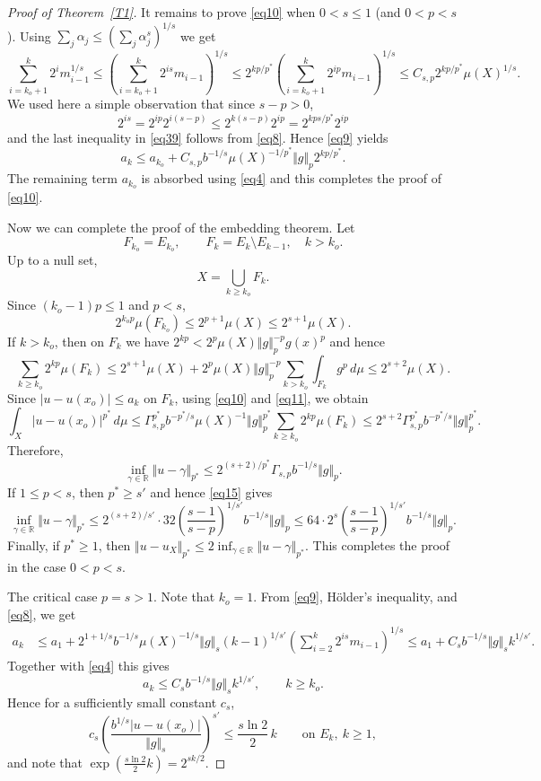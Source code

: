 \documentclass[12pt,leqno]{amsart}
\theoremstyle{definition}
\newcommand{\bbbr}{\mathbb R}
\numberwithin{theorem}{section} \numberwithin{equation}{section}
\begin{document}
\begin{proof}[Proof of Theorem~\ref{T1}]
It remains to prove \eqref{eq10} when $0<s\leq 1$ (and $0<p<s$). Using
$\sum_j\alpha_j\leq\left(\sum_j\alpha_j^s\right)^{1/s}$
we get
\begin{equation}
\label{eq39}
\sum_{i=k_o+1}^k2^im_{i-1}^{1/s}
\leq
\left(\sum_{i=k_o+1}^k2^{is}m_{i-1}\right)^{1/s}
\leq
2^{kp/p^*}
\left(\sum_{i=k_o+1}^k2^{ip}m_{i-1}\right)^{1/s}
\leq C_{s,p}2^{kp/p^*}\mu(X)^{1/s}.
\end{equation}
We used here a simple observation that since $s-p>0$,
\[
2^{is}=2^{ip}2^{i(s-p)}\leq 2^{k(s-p)}2^{ip}=2^{kps/p^*}2^{ip}
\]
and the last inequality in \eqref{eq39} follows from \eqref{eq8}. Hence \eqref{eq9} yields
\[
a_k\leq a_{k_o}+C_{s,p}b^{-1/s}\mu(X)^{-1/p^*}\Vert g\Vert_p2^{kp/p^*}.
\]
The remaining term $a_{k_o}$ is absorbed using \eqref{eq4} and this completes the proof of \eqref{eq10}.


Now we can complete the proof of the embedding theorem.
Let
\[
 F_{k_o}=E_{k_o},
 \qquad
 F_k=E_k\setminus E_{k-1},\quad k>k_o.
\]
Up to a null set,
\[
 X=\bigcup_{k\geq k_o}F_k.
\]
Since $(k_o-1)p\leq1$ and $p<s$,
\[
 2^{k_op}\mu(F_{k_o})
 \leq 2^{p+1}\mu(X)
 \leq 2^{s+1}\mu(X).
\]
If $k>k_o$, then on $F_k$ we have
$2^{kp}<2^p\mu(X)\Vert g\Vert_p^{-p}g(x)^p$
and hence
\begin{equation}
\label{eq11}
 \sum_{k\geq k_o}2^{kp}\mu(F_k)
 \leq
2^{s+1}\mu(X)+ 
2^p\mu(X)\Vert g\Vert_p^{-p}
\sum_{k>k_o}\int_{F_k}g^p\,d\mu
 \leq 2^{s+2}\mu(X).
\end{equation}
Since $|u-u(x_o)|\leq a_k$ on $F_k$,
using \eqref{eq10} and \eqref{eq11}, we obtain
\[
\int_X|u-u(x_o)|^{p^*}\,d\mu
\leq \Gamma_{s,p}^{p^*}b^{-p^*/s}\mu(X)^{-1}\Vert g\Vert_p^{p^*}
\sum_{k\geq k_o}2^{kp}\mu(F_k)
\leq 2^{s+2}\Gamma_{s,p}^{p^*}b^{-p^*/s}\Vert g\Vert_p^{p^*}.
\]
Therefore,
\[
\inf_{\gamma\in\mathbb R}\Vert u-\gamma\Vert_{p^*}
\leq 2^{(s+2)/p^*} \Gamma_{s,p}b^{-1/s}\Vert g\Vert_p.
\]
If $1\leq p<s$, then $p^*\geq s'$ and hence \eqref{eq15} gives
\[
\inf_{\gamma\in\mathbb R}\Vert u-\gamma\Vert_{p^*}
\leq 2^{(s+2)/s'}\cdot 32 \left(\frac{s-1}{s-p}\right)^{1/s'}
b^{-1/s}\Vert g\Vert_p
\leq 64\cdot 2^s\left(\frac{s-1}{s-p}\right)^{1/s'}
b^{-1/s}\Vert g\Vert_p.
\]
Finally, if $p^*\geq1$, then 
$\Vert u-u_X\Vert_{p^*}\leq 2\inf_{\gamma\in\bbbr}\Vert u-\gamma\Vert_{p^*}$.
This completes the proof in the case $0<p<s$.


\noindent
{\sc The critical case $p=s>1$.}
Note that $k_o=1$. From \eqref{eq9}, H\"older's inequality, and \eqref{eq8}, we get
\begin{align*}
 a_k
 &\leq a_{1}
 +2^{1+1/s}b^{-1/s}\mu(X)^{-1/s}\Vert g\Vert_{s}
 (k-1)^{1/s'}\left(\sum_{i=2}^k2^{is}m_{i-1}\right)^{1/s}
\leq
a_1+C_s b^{-1/s}\Vert g\Vert_sk^{1/s'}.
\end{align*}
Together with \eqref{eq4} this gives
\begin{equation}
\label{eq12}
 a_k\leq C_s b^{-1/s}\Vert g\Vert_{s} k^{1/s'},
 \qquad k\geq k_o.
\end{equation}
Hence for a sufficiently small constant $c_s$,
\[
c_s\left(\frac{b^{1/s}|u-u(x_o)|}{\Vert g\Vert_s}\right)^{s'}
\leq \frac{s\ln 2}{2}\, k
\qquad
\text{on } E_k,\ k\geq 1,
\]
and note that $\exp(\frac{s\ln 2}{2}k)=2^{sk/2}$.


\end{proof}
\end{document}
